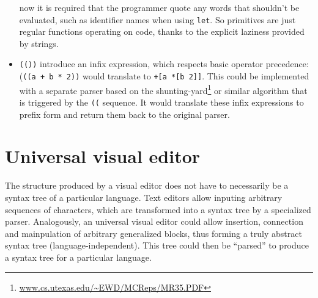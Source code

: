\begin{itemize}
      now it is required that the programmer quote any words that shouldn't be
      evaluated, such as identifier names when using \texttt{let}. So primitives
      are just regular functions operating on code, thanks to the explicit
      laziness provided by strings.
    \item \texttt{(())} introduce an infix expression, which respects basic
      operator precedence: (\texttt{((a + b * 2))} would translate to
      \texttt{+[a *[b 2]]}. This could be implemented with a separate parser
      based on the
      shunting-yard\footnote{\url{www.cs.utexas.edu/~EWD/MCReps/MR35.PDF}} or
      similar algorithm that is triggered by the \texttt{((} sequence. It would
      translate these infix expressions to prefix form and return them back to
      the original parser.
\end{itemize}

\section{Universal visual editor}
The structure produced by a visual editor does not have to necessarily be a
syntax tree of a particular language.  Text editors allow inputing arbitrary
sequences of characters, which are transformed into a syntax tree by a
specialized parser. Analogously, an universal visual editor could allow
insertion, connection and mainpulation of arbitrary generalized blocks, thus
forming a truly abstract syntax tree (language-independent). This tree could
then be ``parsed'' to produce a syntax tree for a particular language.
